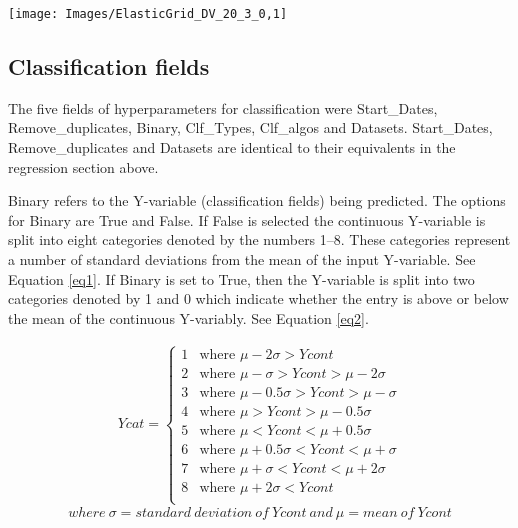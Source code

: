 \documentclass[11pt,preprint, authoryear]{elsarticle}
\let\origfigure\figure
\let\endorigfigure\endfigure
\renewenvironment{figure}[1][2] {
    \expandafter\origfigure\expandafter[H]
} {
    \endorigfigure
}
\numberwithin{equation}{section}
\numberwithin{figure}{section}
\numberwithin{table}{section}
\begin{document}
\begin{figure}[H]

{\centering \texttt{[image: Images/ElasticGrid\_DV\_20\_3\_0,1]}

}

\caption{Elastic net: test set \label{Figure18}}\label{fig:Elastic net: control set}
\end{figure}

\hypertarget{classification-fields}{%
\subsection{Classification fields}\label{classification-fields}}

The five fields of hyperparameters for classification were Start\_Dates,
Remove\_duplicates, Binary, Clf\_Types, Clf\_algos and Datasets.
Start\_Dates, Remove\_duplicates and Datasets are identical to their
equivalents in the regression section above.

Binary refers to the Y-variable (classification fields) being predicted.
The options for Binary are True and False. If False is selected the
continuous Y-variable is split into eight categories denoted by the
numbers 1--8. These categories represent a number of standard deviations
from the mean of the input Y-variable. See Equation \ref{eq1}. If Binary
is set to True, then the Y-variable is split into two categories denoted
by 1 and 0 which indicate whether the entry is above or below the mean
of the continuous Y-variably. See Equation \ref{eq2}.

\begin{align}
Ycat=   \left\{
\begin{array}{ll}
      1  &\text{where } \mu-2\sigma>Ycont \label{eq1} \\
      2  &\text{where } \mu-\sigma>Ycont>\mu-2\sigma \\
      3  &\text{where } \mu-0.5\sigma>Ycont>\mu-\sigma \\
      4  &\text{where } \mu>Ycont>\mu-0.5\sigma \\
      5  &\text{where } \mu<Ycont<\mu+0.5\sigma \\
      6  &\text{where } \mu+0.5\sigma<Ycont<\mu+\sigma \\
      7  &\text{where } \mu+\sigma<Ycont<\mu+2\sigma \\
      8  &\text{where } \mu+2\sigma<Ycont \\
\end{array}
\right.
\end{align} \[
where \ \sigma = standard \ deviation \ of \ Ycont \ and \ \mu = mean \ of \ Ycont
\]
\end{document}
